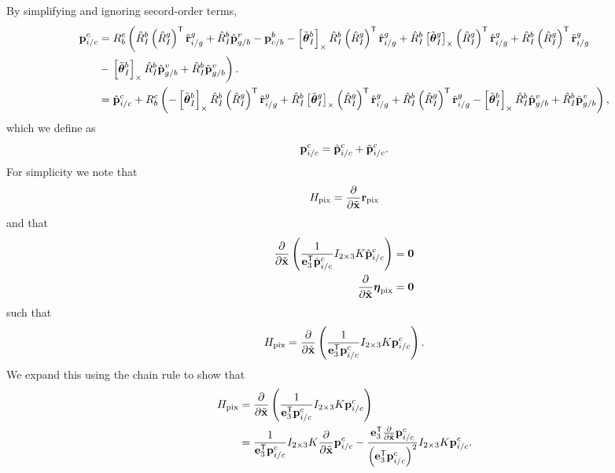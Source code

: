 By simplifying and ignoring secord-order terms,
\begin{align*}
  \boldsymbol{\mathrm{p}}_{i/c}^c &= R_b^c \left( \hat{R}_I^b \left( \hat{R}_I^g \right)^{\mathsf{T}}
  \hat{\boldsymbol{\mathrm{r}}}_{i/g}^g + \hat{R}_I^b \hat{\boldsymbol{\mathrm{p}}}_{g/b}^v - \boldsymbol{\mathrm{p}}_{c/b}^b
  - \left[ \tilde{\boldsymbol{\mathrm{\theta}}}_I^b \right]_{\times} \hat{R}_I^b \left( \hat{R}_I^g
    \right)^{\mathsf{T}} \hat{\boldsymbol{\mathrm{r}}}_{i/g}^g + \hat{R}_I^b
    \left[ \tilde{\boldsymbol{\mathrm{\theta}}}_I^g \right]_{\times} \left( \hat{R}_I^g
  \right)^{\mathsf{T}} \hat{\boldsymbol{\mathrm{r}}}_{i/g}^g +
\hat{R}_I^b \left( \hat{R}_I^g
    \right)^{\mathsf{T}} \tilde{\boldsymbol{\mathrm{r}}}_{i/g}^g \right. \\
                   &- \left. \left[ \tilde{\boldsymbol{\mathrm{\theta}}}_I^b \right]_{\times} \hat{R}_I^b \hat{\boldsymbol{\mathrm{p}}}_{g/b}^v
    + \hat{R}_I^b \tilde{\boldsymbol{\mathrm{p}}}_{g/b}^v
   \right). \\
    &= \hat{\boldsymbol{\mathrm{p}}}_{i/c}^c
    + R_b^c \left( 
  - \left[ \tilde{\boldsymbol{\mathrm{\theta}}}_I^b \right]_{\times} \hat{R}_I^b \left( \hat{R}_I^g
    \right)^{\mathsf{T}} \hat{\boldsymbol{\mathrm{r}}}_{i/g}^g + \hat{R}_I^b
    \left[ \tilde{\boldsymbol{\mathrm{\theta}}}_I^g \right]_{\times} \left( \hat{R}_I^g
  \right)^{\mathsf{T}} \hat{\boldsymbol{\mathrm{r}}}_{i/g}^g +
\hat{R}_I^b \left( \hat{R}_I^g
    \right)^{\mathsf{T}} \tilde{\boldsymbol{\mathrm{r}}}_{i/g}^g
                   - \left[ \tilde{\boldsymbol{\mathrm{\theta}}}_I^b \right]_{\times} \hat{R}_I^b \hat{\boldsymbol{\mathrm{p}}}_{g/b}^v
    + \hat{R}_I^b \tilde{\boldsymbol{\mathrm{p}}}_{g/b}^v
   \right), 
\end{align*}
which we define as
\begin{equation*}
  \boldsymbol{\mathrm{p}}_{i/c}^c = \hat{\boldsymbol{\mathrm{p}}}_{i/c}^c + \tilde{\boldsymbol{\mathrm{p}}}_{i/c}^c .
\end{equation*}
For simplicity we note that 
\begin{equation}
  H_{\text{pix}} = \frac{\partial}{\partial \tilde{\boldsymbol{\mathrm{x}}}} \boldsymbol{\mathrm{r}}_{\text{pix}}
\end{equation}
and that
\begin{align*}
  \frac{\partial}{\partial \tilde{\boldsymbol{\mathrm{x}}}} \left( \frac{1}{\boldsymbol{\mathrm{e}}_3^{\mathsf{T}} \hat{\boldsymbol{\mathrm{p}}}_{i/c}^c} I_{2 \times 3} K
  \hat{\boldsymbol{\mathrm{p}}}_{i/c}^c \right) &= \boldsymbol{\mathrm{0}}
\\
  \frac{\partial}{\partial \tilde{\boldsymbol{\mathrm{x}}}} \boldsymbol{\mathrm{\eta}}_{\text{pix}} &= \boldsymbol{\mathrm{0}}
\end{align*}
such that
\begin{equation}
  H_{\text{pix}} = \frac{\partial}{\partial \tilde{\boldsymbol{\mathrm{x}}}}
 \left( \frac{1}{\boldsymbol{\mathrm{e}}_3^{\mathsf{T}} \boldsymbol{\mathrm{p}}_{i/c}^c} I_{2 \times 3} K
 \boldsymbol{\mathrm{p}}_{i/c}^c \right).
\end{equation}
We expand this using the chain rule to show that
\begin{align}
  H_{\text{pix}} &= \frac{\partial}{\partial \tilde{\boldsymbol{\mathrm{x}}}}
 \left( \frac{1}{\boldsymbol{\mathrm{e}}_3^{\mathsf{T}} \boldsymbol{\mathrm{p}}_{i/c}^c} I_{2 \times 3} K
 \boldsymbol{\mathrm{p}}_{i/c}^c \right) \\
  &= 
 \frac{1}{\boldsymbol{\mathrm{e}}_3^{\mathsf{T}} \boldsymbol{\mathrm{p}}_{i/c}^c} I_{2 \times 3} K
 \frac{\partial}{\partial \tilde{\boldsymbol{\mathrm{x}}}} \boldsymbol{\mathrm{p}}_{i/c}^c 
 - \frac{\boldsymbol{\mathrm{e}}_3^{\mathsf{T}} \frac{\partial}{\partial \tilde{\boldsymbol{\mathrm{x}}}} 
 \boldsymbol{\mathrm{p}}_{i/c}^c}{\left( \boldsymbol{\mathrm{e}}_3^{\mathsf{T}}
 \boldsymbol{\mathrm{p}}_{i/c}^c \right)^2 } I_{2 \times 3} K
  \boldsymbol{\mathrm{p}}_{i/c}^c. 
  \label{eq:H_pix_expanded}
\end{align}
